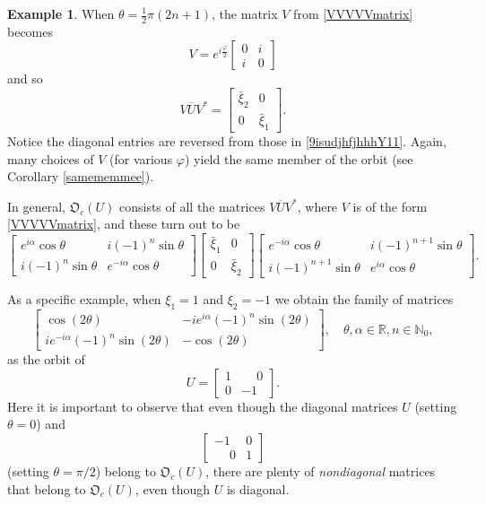 \documentclass{dis}
\theoremstyle{plain}
\theoremstyle{definition}
\newtheorem{Example}[equation]{Example}
\def\R{\mathbb{R}}
\def\N{\mathbb{N}}
\newcommand{\0}{{\color{lightgray}0}}
\begin{document}
\begin{Example}
 When $\theta = \frac{1}{2} \pi (2 n + 1)$, the matrix $V$ from \eqref{VVVVVmatrix} becomes
$$V = e^{i \frac{\varphi}{2}}\begin{bmatrix} 0 & i\\
i & 0\end{bmatrix}$$
and so
$$V \overline{U} V^{*} = \begin{bmatrix} \bar \xi_2 & 0\\
0 & \bar \xi_1\end{bmatrix}.$$
Notice the diagonal entries are reversed from those in \eqref{9isudjhfjhhhY11}.
Again, many choices of $V$ (for various $\varphi$) yield the same member of the orbit (see Corollary \ref{samememmee}). 


In general,  $\mathfrak{O}_c(U)$ consists of all the matrices $V \overline{U} V^{*}$, where $V$ is of the form \eqref{VVVVVmatrix}, and these turn out to be
$$\begin{bmatrix} e^{i \alpha} \cos \theta & i (-1)^n \sin \theta\\
i (-1)^n \sin \theta & e^{-i \alpha} \cos \theta\end{bmatrix} \begin{bmatrix} \bar \xi_1 & 0\\ 0 & \bar \xi_2 \end{bmatrix} \begin{bmatrix} e^{- i \alpha} \cos \theta & i (-1)^{n + 1} \sin \theta\\
i (-1)^{n + 1} \sin \theta & e^{i \alpha} \cos \theta\end{bmatrix}.$$


As a specific example, when $\xi_1 = 1$ and $\xi_2 = -1$ we obtain the family of matrices
$$\begin{bmatrix}
\cos (2 \theta) & -i e^{i \alpha} (-1)^n \sin (2 \theta) \\
 i e^{-i \alpha}  (-1)^n \sin (2 \theta) & -\cos (2 \theta)
 \end{bmatrix}, \quad \theta, \alpha \in \R, n \in \N_{0},$$
 as the orbit of 
 $$U = \begin{bmatrix} 1 & \phantom{-}0\\ 0 & -1\end{bmatrix}.$$ Here it is important to observe that even though the diagonal matrices $U$ (setting $\theta = 0$) and 
 $$\begin{bmatrix} -1 &0\\\phantom{-}0 & 1\end{bmatrix}$$
  (setting $\theta = \pi/2$) belong to $\mathfrak{O}_c(U)$, there are plenty of {\em nondiagonal} matrices that belong to $\mathfrak{O}_c(U)$, even though $U$ is diagonal. 


\end{Example}
\end{document}
